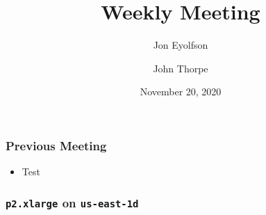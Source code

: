 

\title{Weekly Meeting}
\date{November 20, 2020}
\author{Jon Eyolfson \and John Thorpe}



  \begin{frame}[plain]
    \titlepage
  \end{frame}

  \setcounter{framenumber}{0}

  \begin{frame}
    \frametitle{Previous Meeting}

    \begin{itemize}
      \item Test
    \end{itemize}
  \end{frame}

  \begin{frame}
    \frametitle{\texttt{p2.xlarge} on \texttt{us-east-1d}}

    
  \end{frame}


